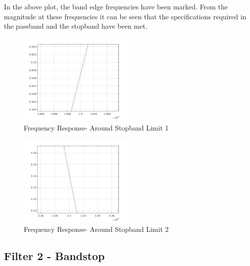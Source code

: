 \documentclass[12pt]{article}
\begin{document}
In the above plot, the band edge frequencies have been marked. From the magnitude at these frequencies it can be seen that the specifications required in the passband and the stopband have been met.
\begin{figure}[h!]
	\centering	
	\includegraphics[width = 0.5\textwidth]{1firsb1.jpg}
    \caption{Frequency Response- Around Stopband Limit 1}
\end{figure}
\begin{figure}[h!]
	\centering	
	\includegraphics[width = 0.5\textwidth]{1firsb2.jpg}
    \caption{Frequency Response- Around Stopband Limit 2}
\end{figure}
\clearpage
\newpage
\subsection{Filter 2 - Bandstop}
\end{document}
